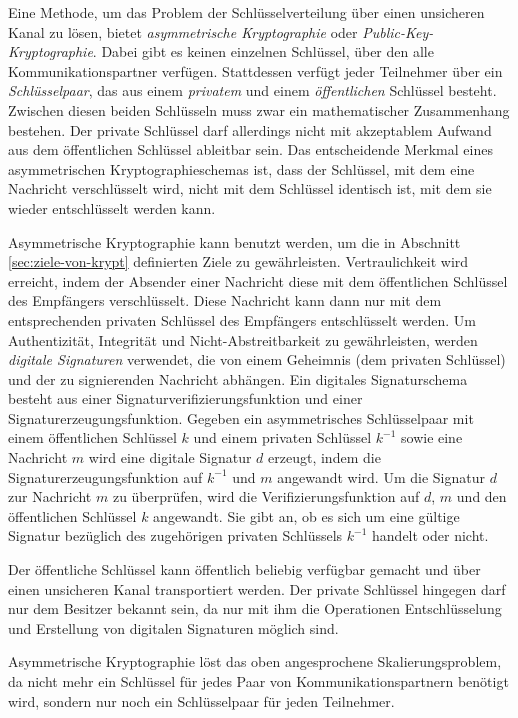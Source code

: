 Eine Methode, um das Problem der Schlüsselverteilung über einen
unsicheren Kanal zu lösen, bietet \emph{asymmetrische Kryptographie}
oder \emph{Public-Key-Kryptographie}. Dabei gibt es keinen einzelnen
Schlüssel, über den alle Kommunikationspartner
verfügen. Stattdessen verfügt jeder Teilnehmer über ein
\emph{Schlüsselpaar}, das aus einem \emph{privatem} und einem
\emph{öffentlichen} Schlüssel besteht. Zwischen diesen beiden
Schlüsseln muss zwar ein mathematischer Zusammenhang bestehen. Der
private Schlüssel darf allerdings nicht mit akzeptablem Aufwand aus
dem öffentlichen Schlüssel ableitbar sein. Das entscheidende
Merkmal eines asymmetrischen Kryptographieschemas ist, dass der
Schlüssel, mit dem eine Nachricht verschlüsselt wird, nicht mit
dem Schlüssel identisch ist, mit dem sie wieder entschlüsselt
werden kann.

Asymmetrische Kryptographie kann benutzt werden, um die in Abschnitt
\ref{sec:ziele-von-krypt} definierten Ziele zu
gewährleisten. Vertraulichkeit wird erreicht, indem der Absender
einer Nachricht diese mit dem öffentlichen Schlüssel des
Empfängers verschlüsselt. Diese Nachricht kann dann nur mit dem
entsprechenden privaten Schlüssel des Empfängers entschlüsselt
werden. Um Authentizität, Integrität und Nicht-Abstreitbarkeit zu
gewährleisten, werden \emph{digitale Signaturen} verwendet, die von
einem Geheimnis (dem privaten Schlüssel) und der zu signierenden
Nachricht abhängen. Ein digitales Signaturschema besteht aus einer
Signaturverifizierungsfunktion und einer
Signaturerzeugungsfunktion. Gegeben ein asymmetrisches Schlüsselpaar
mit einem öffentlichen Schlüssel $k$ und einem privaten
Schlüssel $k^{-1}$ sowie eine Nachricht $m$ wird eine digitale
Signatur $d$ erzeugt, indem die Signaturerzeugungsfunktion auf
$k^{-1}$ und $m$ angewandt wird. Um die Signatur $d$ zur Nachricht $m$
zu überprüfen, wird die Verifizierungsfunktion auf $d$, $m$ und
den öffentlichen Schlüssel $k$ angewandt. Sie gibt an, ob es sich
um eine gültige Signatur bezüglich des zugehörigen privaten
Schlüssels $k^{-1}$ handelt oder nicht.

Der öffentliche Schlüssel kann öffentlich beliebig verfügbar
gemacht und über einen unsicheren Kanal transportiert werden. Der
private Schlüssel hingegen darf nur dem Besitzer bekannt sein, da
nur mit ihm die Operationen Entschlüsselung und Erstellung von
digitalen Signaturen möglich sind.

Asymmetrische Kryptographie löst das oben angesprochene
Skalierungsproblem, da nicht mehr ein Schlüssel für jedes Paar von
Kommunikationspartnern benötigt wird, sondern nur noch ein
Schlüsselpaar für jeden Teilnehmer.

